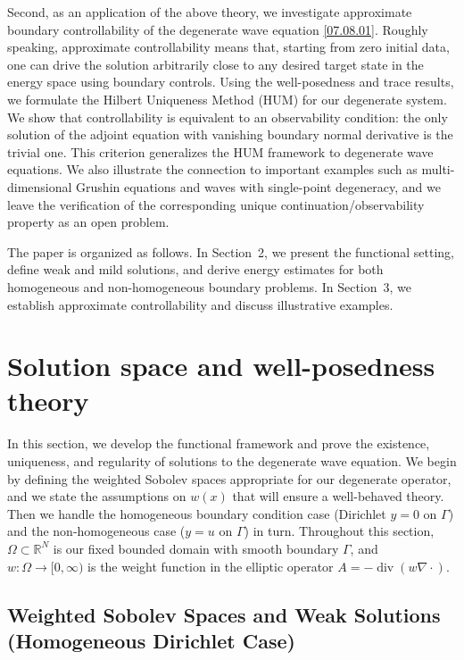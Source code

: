 \documentclass[preprint,12pt]{elsarticle}
\theoremstyle{definition}   %
\numberwithin{equation}{section}
\begin{document}
Second, as an application of the above theory, we investigate approximate boundary controllability of the degenerate wave equation \eqref{07.08.01}. Roughly speaking, approximate controllability means that, starting from zero initial data, one can drive the solution arbitrarily close to any desired target state in the energy space using boundary controls. Using the well-posedness and trace results, we formulate the Hilbert Uniqueness Method (HUM) for our degenerate system. We show that controllability is equivalent to an observability condition: the only solution of the adjoint equation with vanishing boundary normal derivative is the trivial one. This criterion generalizes the HUM framework to degenerate wave equations. We also illustrate the connection to important examples such as multi-dimensional Grushin equations and waves with single-point degeneracy, and we leave the verification of the corresponding unique continuation/observability property as an open problem.

The paper is organized as follows. In Section~2, we present the functional setting, define weak and mild solutions, and derive energy estimates for both homogeneous and non-homogeneous boundary problems. In Section~3, we establish approximate controllability and discuss illustrative examples.

\section{Solution space and well-posedness theory}
In this section, we develop the functional framework and prove the existence, uniqueness, and regularity of solutions to the degenerate wave equation. We begin by defining the weighted Sobolev spaces appropriate for our degenerate operator, and we state the assumptions on $w(x)$ that will ensure a well-behaved theory. Then we handle the homogeneous boundary condition case (Dirichlet $y=0$ on $\Gamma$) and the non-homogeneous case ($y=u$ on $\Gamma$) in turn. Throughout this section, $\Omega\subset \mathbb{R}^N$ is our fixed bounded domain with smooth boundary $\Gamma$, and $w:\Omega\to [0,\infty)$ is the weight function in the elliptic operator $A = -\operatorname{div}(w\nabla\cdot)$.

\subsection{Weighted Sobolev Spaces and Weak Solutions (Homogeneous Dirichlet Case)}
\end{document}
